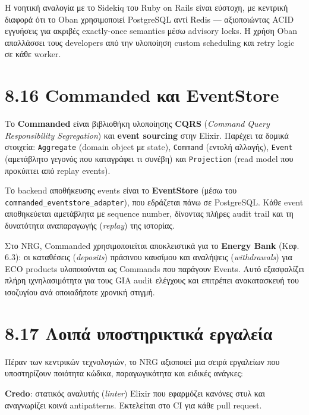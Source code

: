 Η νοητική αναλογία με το Sidekiq του Ruby on Rails είναι εύστοχη, με
κεντρική διαφορά ότι το Oban χρησιμοποιεί PostgreSQL αντί Redis ---
αξιοποιώντας ACID εγγυήσεις για ακριβές exactly-once semantics μέσω
advisory locks. Η χρήση Oban απαλλάσσει τους developers από την
υλοποίηση custom scheduling και retry logic σε κάθε worker.

\section{8.16 Commanded και
EventStore}\label{commanded-ux3baux3b1ux3b9-eventstore}

Το \textbf{Commanded} είναι βιβλιοθήκη υλοποίησης \textbf{CQRS}
(\emph{Command Query Responsibility Segregation}) και \textbf{event
sourcing} στην Elixir. Παρέχει τα δομικά στοιχεία: \texttt{Aggregate}
(domain object με state), \texttt{Command} (εντολή αλλαγής),
\texttt{Event} (αμετάβλητο γεγονός που καταγράφει τι συνέβη) και
\texttt{Projection} (read model που προκύπτει από replay events).

Το backend αποθήκευσης events είναι το \textbf{EventStore} (μέσω του
\texttt{commanded\_eventstore\_adapter}), που εδράζεται πάνω σε
PostgreSQL. Κάθε event αποθηκεύεται αμετάβλητα με sequence number,
δίνοντας πλήρες audit trail και τη δυνατότητα αναπαραγωγής
(\emph{replay}) της ιστορίας.

Στο NRG, Commanded χρησιμοποιείται αποκλειστικά για το \textbf{Energy
Bank} (Κεφ. 6.3): οι καταθέσεις (\emph{deposits}) πράσινου καυσίμου και
αναλήψεις (\emph{withdrawals}) για ECO products υλοποιούνται ως Commands
που παράγουν Events. Αυτό εξασφαλίζει πλήρη ιχνηλασιμότητα για τους GIA
audit ελέγχους και επιτρέπει ανακατασκευή του ισοζυγίου ανά οποιαδήποτε
χρονική στιγμή.

\section{8.17 Λοιπά υποστηρικτικά
εργαλεία}\label{ux3bbux3bfux3b9ux3c0ux3ac-ux3c5ux3c0ux3bfux3c3ux3c4ux3b7ux3c1ux3b9ux3baux3c4ux3b9ux3baux3ac-ux3b5ux3c1ux3b3ux3b1ux3bbux3b5ux3afux3b1}

Πέραν των κεντρικών τεχνολογιών, το NRG αξιοποιεί μια σειρά εργαλείων
που υποστηρίζουν ποιότητα κώδικα, παραγωγικότητα και ειδικές ανάγκες:

\textbf{Credo}: στατικός αναλυτής (\emph{linter}) Elixir που εφαρμόζει
κανόνες στυλ και αναγνωρίζει κοινά antipatterns. Εκτελείται στο CI για
κάθε pull request.

